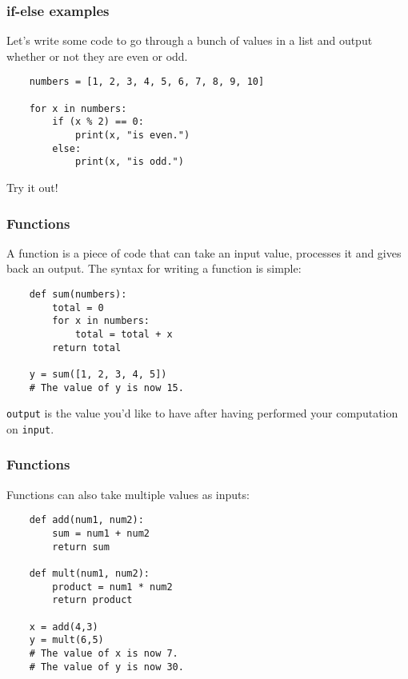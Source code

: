 \documentclass[notes]{beamer}
\begin{document}
\begin{frame}[fragile]
    \frametitle{if-else examples}

    Let's write some code to go through a bunch of values in a list and output whether or not they are even or odd.
    
    \pause
    \begin{lstlisting}
    numbers = [1, 2, 3, 4, 5, 6, 7, 8, 9, 10]

    for x in numbers:
        if (x % 2) == 0:
            print(x, "is even.")
        else:
            print(x, "is odd.")
    \end{lstlisting}
    \pause
    Try it out!
\end{frame}

\begin{frame}[fragile]
    \frametitle{Functions}
    A function is a piece of code that can take an input value, processes it and gives back an output. The syntax for writing a function is simple:
    \begin{lstlisting}
    def sum(numbers):
        total = 0
        for x in numbers:
            total = total + x
        return total

    y = sum([1, 2, 3, 4, 5])
    # The value of y is now 15.
    \end{lstlisting}
    {\tt output} is the value you'd like to have after having performed your computation on {\tt input}.
\end{frame}

\begin{frame}[fragile]
    \frametitle{Functions}
	Functions can also take multiple values as inputs:
    \begin{lstlisting}
    def add(num1, num2):
        sum = num1 + num2
        return sum

    def mult(num1, num2):
        product = num1 * num2
        return product

    x = add(4,3)
    y = mult(6,5)
    # The value of x is now 7.
    # The value of y is now 30.
    \end{lstlisting}
\end{frame}
\end{document}
